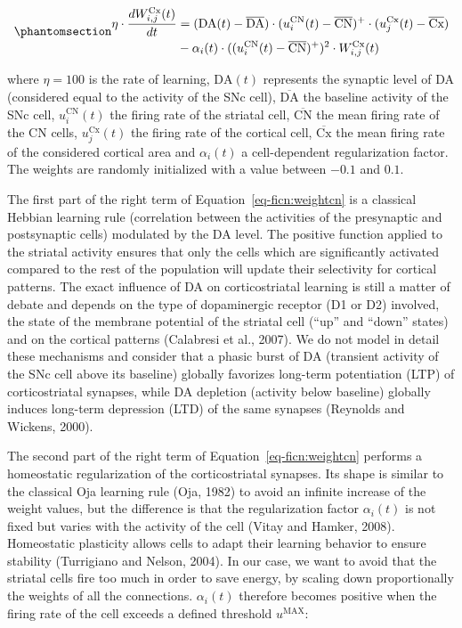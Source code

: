 \documentclass[
  11pt,
  a4paper,
]{scrbook}
\begin{document}
\begin{equation}\phantomsection\label{eq-ficn:weightcn}{
\begin{aligned}
    \eta \cdot \frac{d W^{\text{Cx}}_{i,j}(t)}{d t}  & = ( \text{DA}(t) - \overline{\text{DA}}) \cdot (u^{\text{CN}}_i(t) - \overline{\text{CN}} )^+  \cdot (u^{\text{Cx}}_j(t) - \overline{\text{Cx}}) \nonumber\\
    &  - \alpha_i(t) \cdot  ((u^{\text{CN}}_i(t) - \overline{\text{CN}} )^+ )^2  \cdot W^{\text{Cx}}_{i, j}(t)
\end{aligned}
}\end{equation}

where \(\eta = 100\) is the rate of learning, \(\text{DA}(t)\)
represents the synaptic level of DA (considered equal to the activity of
the SNc cell), \(\overline{\text{DA}}\) the baseline activity of the SNc
cell, \(u^{\text{CN}}_i(t)\) the firing rate of the striatal cell,
\(\overline{\text{CN}}\) the mean firing rate of the CN cells,
\(u^{\text{Cx}}_j(t)\) the firing rate of the cortical cell,
\(\overline{\text{Cx}}\) the mean firing rate of the considered cortical
area and \(\alpha_i(t)\) a cell-dependent regularization factor. The
weights are randomly initialized with a value between \(-0.1\) and
\(0.1\).

The first part of the right term of Equation~\ref{eq-ficn:weightcn} is a
classical Hebbian learning rule (correlation between the activities of
the presynaptic and postsynaptic cells) modulated by the DA level. The
positive function applied to the striatal activity ensures that only the
cells which are significantly activated compared to the rest of the
population will update their selectivity for cortical patterns. The
exact influence of DA on corticostriatal learning is still a matter of
debate and depends on the type of dopaminergic receptor (D1 or D2)
involved, the state of the membrane potential of the striatal cell
(``up'' and ``down'' states) and on the cortical patterns (Calabresi et
al., 2007). We do not model in detail these mechanisms and consider that
a phasic burst of DA (transient activity of the SNc cell above its
baseline) globally favorizes long-term potentiation (LTP) of
corticostriatal synapses, while DA depletion (activity below baseline)
globally induces long-term depression (LTD) of the same synapses
(Reynolds and Wickens, 2000).

The second part of the right term of Equation~\ref{eq-ficn:weightcn}
performs a homeostatic regularization of the corticostriatal synapses.
Its shape is similar to the classical Oja learning rule (Oja, 1982) to
avoid an infinite increase of the weight values, but the difference is
that the regularization factor \(\alpha_i(t)\) is not fixed but varies
with the activity of the cell (Vitay and Hamker, 2008). Homeostatic
plasticity allows cells to adapt their learning behavior to ensure
stability (Turrigiano and Nelson, 2004). In our case, we want to avoid
that the striatal cells fire too much in order to save energy, by
scaling down proportionally the weights of all the connections.
\(\alpha_i(t)\) therefore becomes positive when the firing rate of the
cell exceeds a defined threshold \(u^\text{MAX}\):
\end{document}
